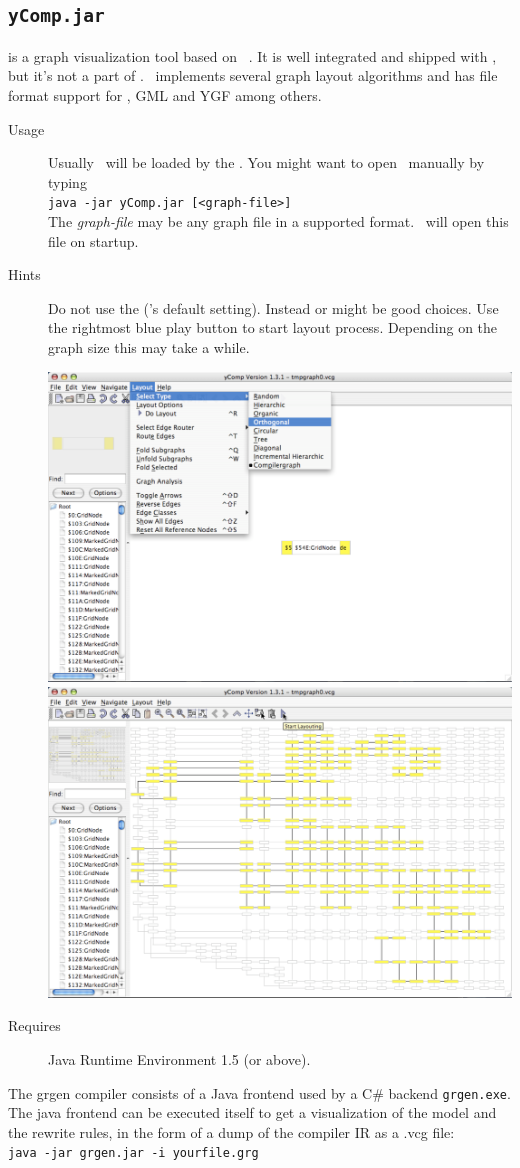 \subsection{\texttt{yComp.jar}}
\label{tools:ycomp}
\yComp{} \cite{ycomp} is a graph visualization tool based on \yFiles\ \cite{yfiles}. 
It is well integrated and shipped with \GrG, but it's not a part of \GrG.
\yComp\ implements several graph layout algorithms and has file format support for , GML and YGF among others. 
\begin{description}
  \item[Usage] Usually \yComp\ will be loaded by the \GrShell. You might want to open \yComp\ manually by typing\\
   \texttt{java -jar yComp.jar [<graph-file>]}\\
  The \emph{graph-file} may be any graph file in a supported format. \yComp\ will open this file on startup.
  \item[Hints] Do not use the   (\yComp's default setting). 
  Instead \texttt{} or \texttt{} might be good choices. 
  Use the rightmost blue play button to start layout process. Depending on the graph size this may take a while.
\begin{center}
\includegraphics[width=0.45\linewidth]{fig/ycomp1.pdf} \includegraphics[width=0.45\linewidth]{fig/ycomp2.pdf}
\end{center}
  \item[Requires] Java Runtime Environment 1.5 (or above).
\end{description}

\begin{note}
The grgen compiler consists of a Java frontend used by a C\# backend \texttt{grgen.exe}.
The java frontend can be executed itself to get a visualization of the model and the rewrite rules,
in the form of a dump of the compiler IR as a .vcg file:\\
\texttt{java -jar grgen.jar -i yourfile.grg}
\end{note}

